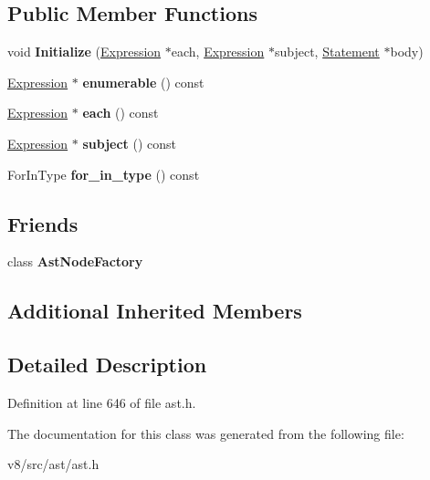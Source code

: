 \subsection*{Public Member Functions}
\begin{DoxyCompactItemize}
\item 
\mbox{\label{classv8_1_1internal_1_1ForInStatement_a9a6e411e8862b5564bf5156ef55acef8}} 
void {\bfseries Initialize} (\mbox{\hyperlink{classv8_1_1internal_1_1Expression}{Expression}} $\ast$each, \mbox{\hyperlink{classv8_1_1internal_1_1Expression}{Expression}} $\ast$subject, \mbox{\hyperlink{classv8_1_1internal_1_1Statement}{Statement}} $\ast$body)
\item 
\mbox{\label{classv8_1_1internal_1_1ForInStatement_ab4ba42392a7dc22494448b8ce5e72915}} 
\mbox{\hyperlink{classv8_1_1internal_1_1Expression}{Expression}} $\ast$ {\bfseries enumerable} () const
\item 
\mbox{\label{classv8_1_1internal_1_1ForInStatement_ad7c376826a1f531b0db62645297727cd}} 
\mbox{\hyperlink{classv8_1_1internal_1_1Expression}{Expression}} $\ast$ {\bfseries each} () const
\item 
\mbox{\label{classv8_1_1internal_1_1ForInStatement_ae95970703291e9d96de071af3f37724b}} 
\mbox{\hyperlink{classv8_1_1internal_1_1Expression}{Expression}} $\ast$ {\bfseries subject} () const
\item 
\mbox{\label{classv8_1_1internal_1_1ForInStatement_a6639f889ea5de27b7ce65340504159c9}} 
For\+In\+Type {\bfseries for\+\_\+in\+\_\+type} () const
\end{DoxyCompactItemize}
\subsection*{Friends}
\begin{DoxyCompactItemize}
\item 
\mbox{\label{classv8_1_1internal_1_1ForInStatement_a8d587c8ad3515ff6433eb83c578e795f}} 
class {\bfseries Ast\+Node\+Factory}
\end{DoxyCompactItemize}
\subsection*{Additional Inherited Members}


\subsection{Detailed Description}


Definition at line 646 of file ast.\+h.



The documentation for this class was generated from the following file\+:\begin{DoxyCompactItemize}
\item 
v8/src/ast/ast.\+h\end{DoxyCompactItemize}
